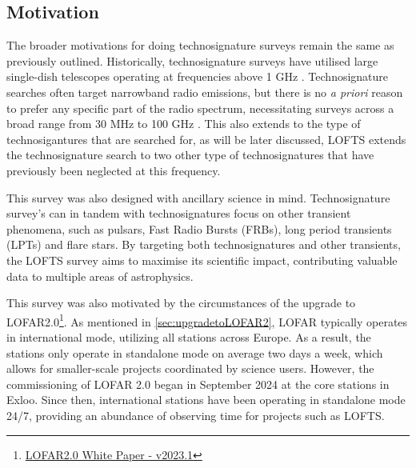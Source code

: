 \subsection{Motivation}

The broader motivations for doing technosignature surveys remain the same as previously outlined. Historically, technosignature surveys have utilised large single-dish telescopes operating at frequencies above 1 GHz \citep{Siemion_KEPLER_ApJ,danny-parkes}. Technosignature searches often target narrowband radio emissions, but there is no \textit{a priori} reason to prefer any specific part of the radio spectrum, necessitating surveys across a broad range from 30 MHz to 100 GHz \citep[\cref{fig:chap1SETIfreq},][]{ng_search_2022}. This also extends to the type of technosigantures that are searched for, as will be later discussed, LOFTS extends the technosignature search to two other type of technosignatures that have previously been neglected at this frequency. 

This survey was also designed with ancillary science in mind. Technosignature survey's can in tandem with technosignatures focus on other transient phenomena, such as pulsars, Fast Radio Bursts (FRBs), long period transients (LPTs) and flare stars. By targeting both technosignatures and other transients, the LOFTS survey aims to maximise its scientific impact, contributing valuable data to multiple areas of astrophysics. 

This survey was also motivated by the circumstances of the upgrade to LOFAR2.0\footnote{\href{https://www.google.com/url?sa=t&source=web&rct=j&opi=89978449&url=https://www.lofar.eu/wp-content/uploads/2023/04/LOFAR2_0_White_Paper_v2023.1.pdf&ved=2ahUKEwjHnrOH3ciHAxU-EkQIHfa6DJUQFnoECBEQAQ&usg=AOvVaw0ze94uccrly_yfSru4PsCZ}{LOFAR2.0 White Paper - v2023.1}}. As mentioned in \cref{sec:upgradetoLOFAR2}, LOFAR typically operates in international mode, utilizing all stations across Europe. As a result, the stations only operate in standalone mode on average two days a week, which allows for smaller-scale projects coordinated by science users. However, the commissioning of LOFAR 2.0 began in September 2024 at the core stations in Exloo. Since then, international stations have been operating in standalone mode 24/7, providing an abundance of observing time for projects such as LOFTS.



